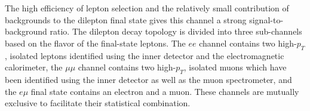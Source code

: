 
The high efficiency of lepton selection and the relatively small contribution of backgrounds
to the dilepton final state %
gives this channel a strong signal-to-background ratio.
The dilepton decay topology is divided into three sub-channels based on the flavor of the
final-state leptons.
The $ee$ channel contains two high-$p_T$, isolated leptons identified using 
the inner detector and the electromagnetic calorimeter, the $\mu\mu$ channel contains two
high-$p_T$, isolated muons which have been identified using the inner detector as well as the muon
spectrometer, and the $e \mu$ final state contains an electron and a muon.
These channels are mutually exclusive to facilitate their statistical combination.



